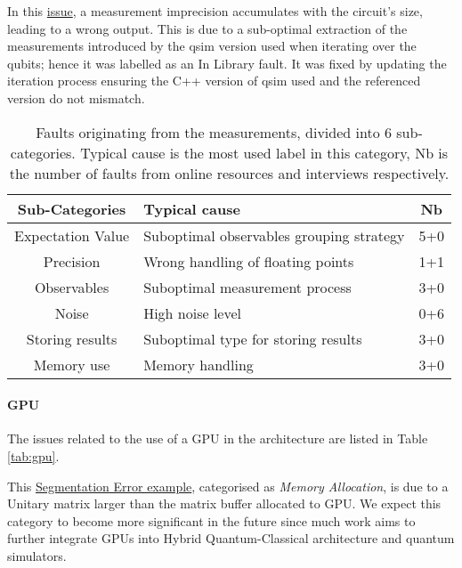 In this \href{https://github.com/tensorflow/quantum/issues/235}{issue}, a measurement imprecision accumulates with the circuit's size, leading to a wrong output. This is due to a sub-optimal extraction of the measurements introduced by the qsim version used when iterating over the qubits; hence it was labelled as an In Library fault. It was fixed by updating the iteration process ensuring the C++ version of qsim used and the referenced version do not mismatch.


\begin{table}[hbt!]
    \centering
        \caption{Faults originating from the measurements, divided into 6 sub-categories. Typical cause is the most used label in this category, Nb is the number of faults from online resources and interviews respectively.}
    \label{tab:measurements}
    \begin{tabular}{@{}c|l|c}
       \textbf{ Sub-Categories} & \textbf{Typical cause} & \textbf{Nb} \\
         \hline
       Expectation Value  & Suboptimal observables grouping strategy &  5+0 \\
         \hline
       Precision  & Wrong handling of floating points & 1+1 \\
         \hline
        Observables & Suboptimal measurement process &  3+0 \\
          \hline
        Noise & High noise level &  0+6 \\
          \hline
        Storing results & Suboptimal type for storing results &  3+0 \\
          \hline
        Memory use & Memory handling  & 3+0 \\
    \end{tabular}
\end{table}

\paragraph{GPU}
The issues related to the use of a GPU in the architecture are listed in Table \ref{tab:gpu}. 

This \href{https://github.com/Qiskit/qiskit-aer/issues/1647}{Segmentation Error example}, categorised as \textit{Memory Allocation}, is due to a Unitary matrix larger than the matrix buffer allocated to GPU. We expect this category to become more significant in the future since much work aims to further integrate GPUs into Hybrid Quantum-Classical architecture and quantum simulators.

